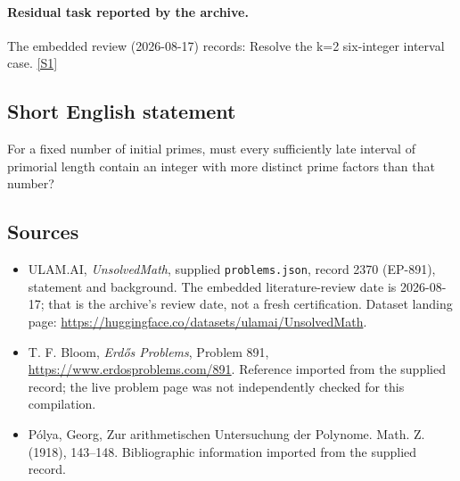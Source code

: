\documentclass[11pt,a4paper]{article}
\newcommand{\sref}[2]{\hyperlink{source:#1:#2}{[S#2]}}
\begin{document}
\paragraph{Residual task reported by the archive.}

The embedded review (2026-08-17) records: Resolve the k=2 six-integer interval case. \sref{2370}{1}

\subsection{Short English statement}

For a fixed number of initial primes, must every sufficiently late interval of primorial length contain an integer with more distinct prime factors than that number?

\subsection{Sources}

{\small

\begin{itemize}

\item[\hypertarget{source:2370:1}{S1}] ULAM.AI, \emph{UnsolvedMath}, supplied \texttt{problems.json}, record 2370 (EP-891), statement and background. The embedded literature-review date is 2026-08-17; that is the archive’s review date, not a fresh certification. Dataset landing page: \url{https://huggingface.co/datasets/ulamai/UnsolvedMath}.

\item[\hypertarget{source:2370:2}{S2}] T. F. Bloom, \emph{Erdős Problems}, Problem 891, \url{https://www.erdosproblems.com/891}. Reference imported from the supplied record; the live problem page was not independently checked for this compilation.

\item[\hypertarget{source:2370:3}{S3}] P\'{o}lya, Georg, Zur arithmetischen {U}ntersuchung der {P}olynome. Math. Z. (1918), 143--148. Bibliographic information imported from the supplied record.

\end{itemize}

}

\label{end:2370}
\end{document}
